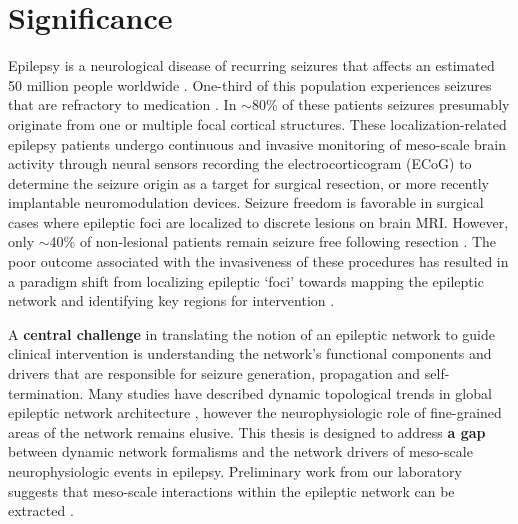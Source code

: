 \section*{Significance}
Epilepsy is a neurological disease of recurring seizures that affects an estimated 50 million people worldwide \cite{kwan2000early}. One-third of this population experiences seizures that are refractory to medication \cite{kwan2000early}. In $\sim$80\% of these patients seizures presumably originate from one or multiple focal cortical structures. These localization-related epilepsy patients undergo continuous and invasive monitoring of meso-scale brain activity through neural sensors recording the electrocorticogram (ECoG) to determine the seizure origin as a target for surgical resection, or more recently implantable neuromodulation devices. Seizure freedom is favorable in surgical cases where epileptic foci are localized to discrete lesions on brain MRI. However, only $\sim$40\% of non-lesional patients remain seizure free following resection \cite{french2007refractory}. The poor outcome associated with the invasiveness of these procedures has resulted in a paradigm shift from localizing epileptic `foci' towards mapping the epileptic network and identifying key regions for intervention \cite{spencer2002neural, kramer2012epilepsy, lehnertz2014evolving}.

A \textbf{central challenge} in translating the notion of an epileptic network to guide clinical intervention is understanding the network's functional components and drivers that are responsible for seizure generation, propagation and self-termination. Many studies have described dynamic topological trends in global epileptic network architecture \cite{jerger2005multivariate, schnidler2006assessing, schindler2008evolving, kramer2010coalescence, jiruska2012synchronization}, however the neurophysiologic role of fine-grained areas of the network remains elusive. This thesis is designed to address \textbf{a gap} between dynamic network formalisms and the network drivers of meso-scale neurophysiologic events in epilepsy. Preliminary work from our laboratory suggests that meso-scale interactions within the epileptic network can be extracted \cite{khambhati2014dynamic}.

